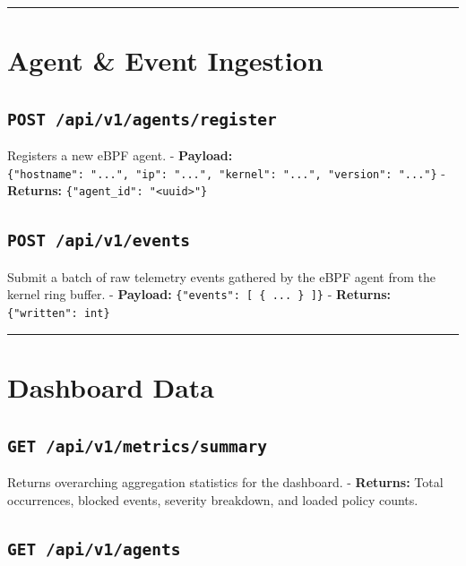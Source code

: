 \documentclass[
  12pt,
]{report}
\begin{document}
\begin{center}\rule{0.5\linewidth}{0.5pt}\end{center}

\section{Agent \& Event Ingestion}\label{agent-event-ingestion}

\subsection{\texorpdfstring{\texttt{POST\ /api/v1/agents/register}}{POST /api/v1/agents/register}}\label{post-apiv1agentsregister}

Registers a new eBPF agent. - \textbf{Payload:}
\texttt{\{"hostname":\ "...",\ "ip":\ "...",\ "kernel":\ "...",\ "version":\ "..."\}}
- \textbf{Returns:}
\texttt{\{"agent\_id":\ "\textless{}uuid\textgreater{}"\}}

\subsection{\texorpdfstring{\texttt{POST\ /api/v1/events}}{POST /api/v1/events}}\label{post-apiv1events}

Submit a batch of raw telemetry events gathered by the eBPF agent from
the kernel ring buffer. - \textbf{Payload:}
\texttt{\{"events":\ {[}\ \{\ ...\ \}\ {]}\}} - \textbf{Returns:}
\texttt{\{"written":\ int\}}

\begin{center}\rule{0.5\linewidth}{0.5pt}\end{center}

\section{Dashboard Data}\label{dashboard-data}

\subsection{\texorpdfstring{\texttt{GET\ /api/v1/metrics/summary}}{GET /api/v1/metrics/summary}}\label{get-apiv1metricssummary}

Returns overarching aggregation statistics for the dashboard. -
\textbf{Returns:} Total occurrences, blocked events, severity breakdown,
and loaded policy counts.

\subsection{\texorpdfstring{\texttt{GET\ /api/v1/agents}}{GET /api/v1/agents}}\label{get-apiv1agents}
\end{document}
